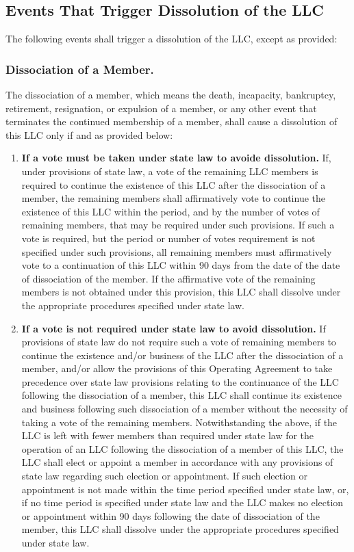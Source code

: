 \documentclass{article}
\begin{document}
			\subsection{Events That Trigger Dissolution of the LLC}
			The following events shall trigger a dissolution of the LLC, except as provided:

				\subsubsection{Dissociation of a Member.}
				The dissociation of a member, which means the death, incapacity, bankruptcy, retirement, resignation, or expulsion of a member, or any other event that terminates the continued membership of a member, shall cause a dissolution of this LLC only if and as provided below:
					\begin{enumerate}[{\bf (i)}]
						\item{\bf If a vote must be taken under state law to avoide dissolution.}
						If, under provisions of state law, a vote of the remaining LLC members is required to continue the existence of this LLC after the dissociation of a member, the remaining members shall affirmatively vote to continue the existence of this LLC within the period, and by the number of votes of remaining members, that may be required under such provisions. If such a vote is required, but the period or number of votes requirement is not specified under such provisions, all remaining members must affirmatively vote to a continuation of this LLC within 90 days from the date of the date of dissociation of the member. If the affirmative vote of the remaining members is not obtained under this provision, this LLC shall dissolve under the appropriate procedures specified under state law.

						\item{\bf If a vote is not required under state law to avoid dissolution.}
						If provisions of state law do not require such a vote of remaining members to continue the existence and/or business of the LLC after the dissociation of a member, and/or allow the provisions of this Operating Agreement to take precedence over state law provisions relating to the continuance of the LLC following the dissociation of a member, this LLC shall continue its existence and business following such dissociation of a member without the necessity of taking a vote of the remaining members. Notwithstanding the above, if the LLC is left with fewer members than required under state law for the operation of an LLC following the dissociation of a member of this LLC, the LLC shall elect or appoint a member in accordance with any provisions of state law regarding such election or appointment. If such election or appointment is not made within the time period specified under state law, or, if no time period is specified under state law and the LLC makes no election or appointment within 90 days following the date of dissociation of the member, this LLC shall dissolve under the appropriate procedures specified under state law.					
					\end{enumerate}
\end{document}
